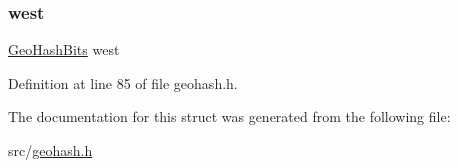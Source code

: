 \subsubsection{\texorpdfstring{west}{west}}
{\footnotesize\ttfamily \hyperlink{struct_geo_hash_bits}{Geo\+Hash\+Bits} west}



Definition at line 85 of file geohash.\+h.



The documentation for this struct was generated from the following file\+:\begin{DoxyCompactItemize}
\item 
src/\hyperlink{geohash_8h}{geohash.\+h}\end{DoxyCompactItemize}
